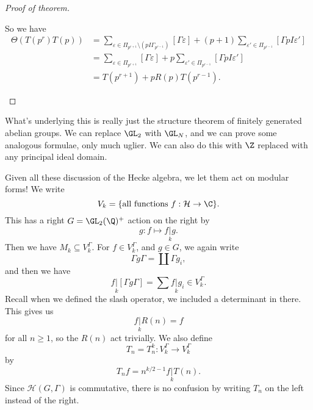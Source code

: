 \documentclass[a4paper]{article}
\renewcommand{\H}{\mathcal{H}}
\begin{document}
\begin{proof}[Proof of theorem]
\begin{enumerate}
      So we have
      \begin{align*}
        \Theta(T(p^r)T(p)) &= \sum_{\varepsilon \in \Pi_{p^{r + 1}} \setminus (pI \Gamma_{p^{r - 1}})} [\Gamma \varepsilon] + (p + 1) \sum_{\varepsilon' \in \Pi_{p^{r - 1}}} [\Gamma pI \varepsilon']\\
        &= \sum_{\varepsilon \in \Pi_{p^{r + 1}}} [\Gamma \varepsilon] + p \sum_{\varepsilon' \in \Pi_{p^{r - 1}}} [\Gamma pI \varepsilon'] \\
        &= T(p^{r + 1}) + p R(p) T(p^{r - 1}).
      \end{align*}
  \end{enumerate}
\end{proof}
What's underlying this is really just the structure theorem of finitely generated abelian groups. We can replace $\GL_2$ with $\GL_N$, and we can prove some analogous formulae, only much uglier. We can also do this with $\Z$ replaced with any principal ideal domain.

Given all these discussion of the Hecke algebra, we let them act on modular forms! We write
\[
  V_k = \{\text{all functions } f: \H \to \C\}.
\]
This has a right $G = \GL_2(\Q)^+$ action on the right by
\[
  g: f \mapsto f \underset{k}{|}g.
\]
Then we have $M_k \subseteq V_k^\Gamma$. For $f \in V_k^\Gamma$, and $g \in G$, we again write
\[
  \Gamma g \Gamma = \coprod \Gamma g_i,
\]
and then we have
\[
  f \underset{k}{|} [\Gamma g \Gamma] = \sum f\underset{k}{|}g_i \in V_k^\Gamma.
\]
Recall when we defined the slash operator, we included a determinant in there. This gives us
\[
  f\underset{k}{|} R(n) = f
\]
for all $n \geq 1$, so the $R(n)$ act trivially. We also define
\[
  T_n = T_n^k: V_k^\Gamma \to V_k^\Gamma
\]
by
\[
  T_n f = n^{k/2 - 1} f \underset{k}{|} T(n).
\]
Since $\mathcal{H}(G, \Gamma)$ is commutative, there is no confusion by writing $T_n$ on the left instead of the right.
\end{document}
